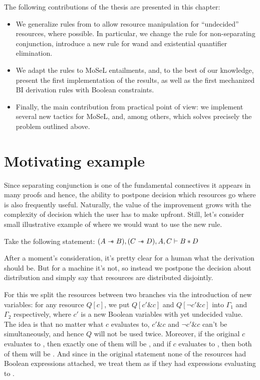 The following contributions of the thesis are presented in this chapter:
\begin{itemize}
\item We generalize rules from \citet{harlandResourceDistributionBooleanConstraints2003} to allow resource manipulation for ``undecided'' resources, where possible.
  In particular, we change the rule for non-separating conjunction, introduce a new rule for wand and existential quantifier elimination.
\item We adapt the rules to MoSeL entailments, and, to the best of our knowledge, present the first implementation of the results, as well as the first mechanized BI derivation rules with Boolean constraints.
\item Finally, the main contribution from practical point of view: we implement several new tactics for MoSeL, and, among others,  which solves precisely the problem outlined above.
\end{itemize}

\section{Motivating example}

Since separating conjunction is one of the fundamental connectives it appears in many proofs and hence, the ability to postpone decision which resources go where is also frequently useful.
Naturally, the value of the improvement grows with the complexity of decision which the user has to make upfront.
Still, let's consider small illustrative example of where we would want to use the new rule.

Take the following statement:
\((A \mathrel{-\mkern-6mu*} B), (C \mathrel{-\mkern-6mu*} D), A, C \vdash B * D\)

After a moment's consideration, it's pretty clear for a human what the derivation should be.
But for a machine it's not, so instead we postpone the decision about distribution and simply say that resources are distributed disjointly.

For this we split the resources between two branches via the introduction of new variables:
for any resource \(Q[c]\), we put \(Q[c' \& c]\) and \(Q[\neg c' \& c]\) into \(\Gamma_1\) and \(\Gamma_2\) respectively, where \(c'\) is a new Boolean variables with yet undecided value.
The idea is that no matter what \(c\) evaluates to, \(c' \& c\) and \(\neg c' \& c\) can't be \true simultaneously, and hence \(Q\) will not be used twice.
Moreover, if the original \(c\) evaluates to \true, then exactly one of them will be \true, and if \(c\) evaluates to \false, then both of them will be \false.
And since in the original statement none of the resources had Boolean expressions attached, we treat them as if they had expressions evaluating to \true.

